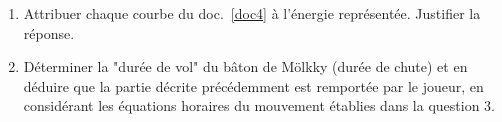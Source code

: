 \documentclass[a4paper,11pt,fleqn]{article}%
\begin{document}
\begin{enumerate}[resume]
    \item Attribuer chaque courbe du doc.~\ref{doc4} à l'énergie représentée. Justifier la réponse.
    \item Déterminer la "durée de vol" du bâton de Mölkky (durée de chute) et en déduire que la partie décrite précédemment est remportée par le joueur, en considérant les équations horaires du mouvement établies dans la question 3.
\end{enumerate}
\end{document}
